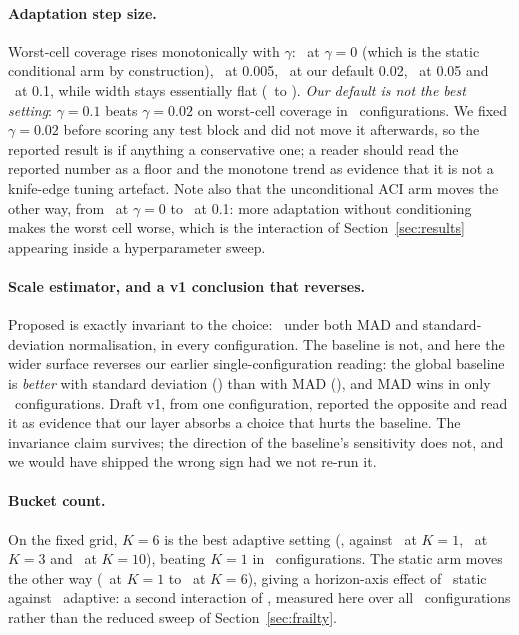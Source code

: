 \documentclass[11pt]{article}
\begin{document}
\paragraph{Adaptation step size.} Worst-cell coverage rises monotonically with $\gamma$: \ablGammaZeroWorst\ at $\gamma = 0$ (which is the static conditional arm by construction), \ablGammaTinyWorst\ at 0.005, \ablGammaDefaultWorst\ at our default 0.02, \ablGammaMidWorst\ at 0.05 and \ablGammaBigWorst\ at 0.1, while width stays essentially flat (\ablGammaZeroWidth\ to \ablGammaBigWidth). \emph{Our default is not the best setting}: $\gamma = 0.1$ beats $\gamma = 0.02$ on worst-cell coverage in \ablGammaBigBeatsDefault\ configurations. We fixed $\gamma = 0.02$ before scoring any test block and did not move it afterwards, so the reported result is if anything a conservative one; a reader should read the reported number as a floor and the monotone trend as evidence that it is not a knife-edge tuning artefact. Note also that the unconditional ACI arm moves the other way, from \ablGammaZeroACI\ at $\gamma = 0$ to \ablGammaBigACI\ at 0.1: more adaptation without conditioning makes the worst cell worse, which is the interaction of Section~\ref{sec:results} appearing inside a hyperparameter sweep.

\paragraph{Scale estimator, and a v1 conclusion that reverses.} Proposed is exactly invariant to the choice: \ablScaleMADProp\ under both MAD and standard-deviation normalisation, in every configuration. The baseline is not, and here the wider surface reverses our earlier single-configuration reading: the global baseline is \emph{better} with standard deviation (\ablScaleSDGlobal) than with MAD (\ablScaleMADGlobal), and MAD wins in only \ablScaleMADbeatsSDGlobal\ configurations. Draft v1, from one configuration, reported the opposite and read it as evidence that our layer absorbs a choice that hurts the baseline. The invariance claim survives; the direction of the baseline's sensitivity does not, and we would have shipped the wrong sign had we not re-run it.

\paragraph{Bucket count.} On the fixed grid, $K = 6$ is the best adaptive setting (\ablKSixProp, against \ablKOneProp\ at $K = 1$, \ablKThreeProp\ at $K = 3$ and \ablKTenProp\ at $K = 10$), beating $K = 1$ in \ablKSixBeatsKOne\ configurations. The static arm moves the other way (\ablKOneCond\ at $K = 1$ to \ablKSixCond\ at $K = 6$), giving a horizon-axis effect of \ablKCondEffect\ static against \ablKPropEffect\ adaptive: a second interaction of \ablKInteraction, measured here over all \ablNumConfigs\ configurations rather than the reduced sweep of Section~\ref{sec:frailty}.
\end{document}
